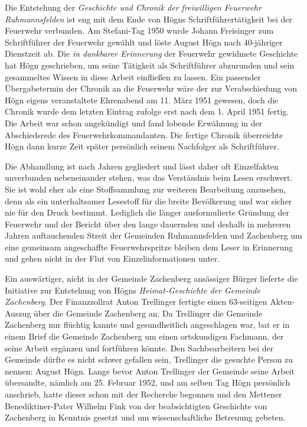 \documentclass{book}
\newcommand{\zitat}[1]{\textit{#1}}
\begin{document}
Die Entstehung der \textit{Geschichte und Chronik der freiwilligen
Feuerwehr Ruhmannsfelden} ist eng mit dem Ende von Högns
Schriftführertätigkeit bei der Feuerwehr verbunden. Am Stefani-Tag
1950 wurde Johann Freisinger zum Schriftführer der Feuerwehr gewählt
und löste August Högn nach 40-jähriger Dienstzeit ab. Die
\zitat{in dankbarer Erinnerung} der Feuerwehr gewidmete
Geschichte hat Högn geschrieben, um seine Tätigkeit als Schriftführer
abzurunden und sein gesammeltes Wissen in diese Arbeit einfließen
zu lassen. Ein passender Übergabetermin der Chronik an die Feuerwehr
wäre der zur Verabschiedung von Högn eigens veranstaltete Ehrenabend
am 11. März 1951 gewesen, doch die Chronik wurde dem letzten Eintrag
zufolge erst nach dem 1. April 1951 fertig. Die Arbeit war schon
angekündigt und fand lobende Erwähnung in der Abschiedsrede des
Feuerwehrkommandanten. Die fertige Chronik überreichte Högn dann kurze
Zeit später persönlich seinem Nachfolger als Schriftführer.

Die Abhandlung ist nach Jahren gegliedert und lässt daher oft
Einzelfakten unverbunden nebeneinander stehen, was das Verständnis beim
Lesen erschwert. Sie ist wohl eher als eine Stoffsammlung zur
weiteren Bearbeitung anzusehen, denn als ein unterhaltsamer Lesestoff
für die breite Bevölkerung und war sicher nie für den Druck bestimmt.
Lediglich die länger ausformulierte Gründung der Feuerwehr und der
Bericht über den lange dauernden und deshalb in mehreren Jahren
auftauchenden Streit der Gemeinden Ruhmannsfelden und Zachenberg um
eine gemeinsam angeschaffte Feuerwehrspritze bleiben dem Leser in
Erinnerung und gehen nicht in der Flut von Einzelinformationen unter.

Ein auswärtiger, nicht in der Gemeinde Zachenberg ansässiger Bürger
lieferte die Initiative zur Entstehung von Högns
\textit{Heimat-Geschichte der Gemeinde Zachenberg}. Der Finanzzollrat
Anton Trellinger fertigte einen 63-seitigen Akten-Auszug über die
Gemeinde Zachenberg an. Da Trellinger die Gemeinde Zachenberg nur
flüchtig kannte und gesundheitlich angeschlagen war, bat er in einem
Brief die Gemeinde Zachenberg um einen ortskundigen Fachmann, der seine
Arbeit ergänzen und fortführen könnte. Den Sachbearbeitern bei der
Gemeinde dürfte es nicht schwer gefallen sein, Trellinger die gesuchte
Person zu nennen: August Högn. Lange bevor Anton Trellinger der
Gemeinde seine Arbeit übersandte, nämlich am 25. Februar 1952, und am
selben Tag Högn persönlich anschrieb, hatte dieser schon mit der
Recherche begonnen und den Mettener Benediktiner-Pater Wilhelm Fink von
der beabsichtigten Geschichte von Zachenberg in Kenntnis gesetzt und um
wissenschaftliche Betreuung gebeten.
\end{document}
